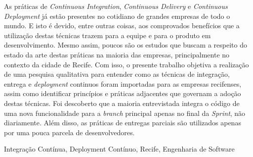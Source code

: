 \resumo

As práticas de \emph{Continuous Integration}, \emph{Continuous Delivery} e \emph{Continuous Deployment} já estão presentes no cotidiano de grandes empresas de todo o mundo. E isto é devido, entre outras coisas, aos comprovados benefícios que a utilização destas técnicas trazem para a equipe e para o produto em desenvolvimento. Mesmo assim, poucos são os estudos que buscam a respeito do estado da arte destas práticas na maioria das empresas, principalmente no contexto da cidade de Recife.  Com isso, o presente trabalho objetiva a realização de uma pesquisa qualitativa para entender como as técnicas de integração, entrega e \emph{deployment} continuos foram importadas para as empresas recifenses, assim como identificar princípios e práticas adjacentes que governam a adoção destas técnicas. Foi descoberto que a maioria entrevistada integra o código de uma nova funcionalidade para a \emph{branch} principal apenas no final da \emph{Sprint}, não diariamente. Além disso, as práticas de entregas parciais são utilizados apenas por uma pouca parcela de desenvolvedores.

\begin{keywords}
    Integração Contínua, Deployment Contínuo, Recife, Engenharia de Software
\end{keywords}
